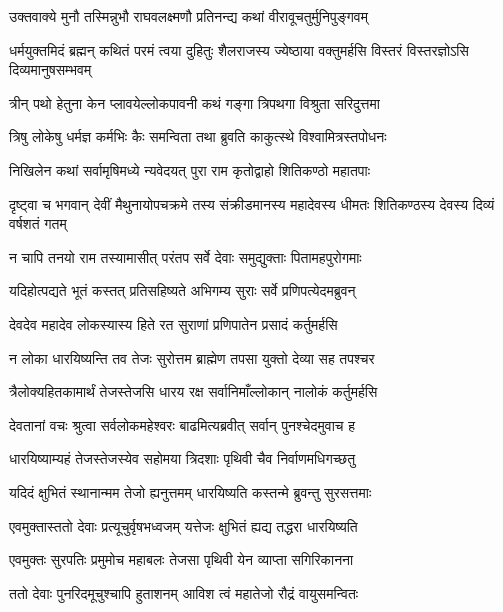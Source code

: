 
\twolineshloka
{उक्तवाक्ये मुनौ तस्मिन्नुभौ राघवलक्ष्मणौ}
{प्रतिनन्द्य कथां वीरावूचतुर्मुनिपुङ्गवम्} %

\threelineshloka
{धर्मयुक्तमिदं ब्रह्मन् कथितं परमं त्वया}
{दुहितुः शैलराजस्य ज्येष्ठाया वक्तुमर्हसि}
{विस्तरं विस्तरज्ञोऽसि दिव्यमानुषसम्भवम्} %

\twolineshloka
{त्रीन् पथो हेतुना केन प्लावयेल्लोकपावनी}
{कथं गङ्गा त्रिपथगा विश्रुता सरिदुत्तमा} %

\twolineshloka
{त्रिषु लोकेषु धर्मज्ञ कर्मभिः कैः समन्विता}
{तथा ब्रुवति काकुत्स्थे विश्वामित्रस्तपोधनः} %

\twolineshloka
{निखिलेन कथां सर्वामृषिमध्ये न्यवेदयत्}
{पुरा राम कृतोद्वाहो शितिकण्ठो महातपाः} %

\threelineshloka
{दृष्ट्वा च भगवान् देवीं मैथुनायोपचक्रमे}
{तस्य संक्रीडमानस्य महादेवस्य धीमतः}
{शितिकण्ठस्य देवस्य दिव्यं वर्षशतं गतम्} %

\twolineshloka
{न चापि तनयो राम तस्यामासीत् परंतप}
{सर्वे देवाः समुद्युक्ताः पितामहपुरोगमाः} %

\twolineshloka
{यदिहोत्पद्यते भूतं कस्तत् प्रतिसहिष्यते}
{अभिगम्य सुराः सर्वे प्रणिपत्येदमब्रुवन्} %

\twolineshloka
{देवदेव महादेव लोकस्यास्य हिते रत}
{सुराणां प्रणिपातेन प्रसादं कर्तुमर्हसि} %

\twolineshloka
{न लोका धारयिष्यन्ति तव तेजः सुरोत्तम}
{ब्राह्मेण तपसा युक्तो देव्या सह तपश्चर} %

\twolineshloka
{त्रैलोक्यहितकामार्थं तेजस्तेजसि धारय}
{रक्ष सर्वानिमाँल्लोकान् नालोकं कर्तुमर्हसि} %

\twolineshloka
{देवतानां वचः श्रुत्वा सर्वलोकमहेश्वरः}
{बाढमित्यब्रवीत् सर्वान् पुनश्चेदमुवाच ह} %

\twolineshloka
{धारयिष्याम्यहं तेजस्तेजस्येव सहोमया}
{त्रिदशाः पृथिवी चैव निर्वाणमधिगच्छतु} %

\twolineshloka
{यदिदं क्षुभितं स्थानान्मम तेजो ह्यनुत्तमम्}
{धारयिष्यति कस्तन्मे ब्रुवन्तु सुरसत्तमाः} %

\twolineshloka
{एवमुक्तास्ततो देवाः प्रत्यूचुर्वृषभध्वजम्}
{यत्तेजः क्षुभितं ह्यद्य तद्धरा धारयिष्यति} %

\twolineshloka
{एवमुक्तः सुरपतिः प्रमुमोच महाबलः}
{तेजसा पृथिवी येन व्याप्ता सगिरिकानना} %

\twolineshloka
{ततो देवाः पुनरिदमूचुश्चापि हुताशनम्}
{आविश त्वं महातेजो रौद्रं वायुसमन्वितः} %

